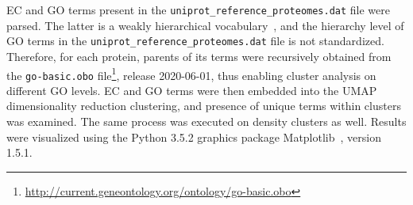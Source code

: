 EC and GO terms present in the \texttt{uniprot\_reference\_proteomes.dat} file were
parsed.
The latter is a weakly hierarchical vocabulary~\cite{ashburner2000gene}, and the hierarchy
level of GO terms in the \texttt{uniprot\_reference\_proteomes.dat} file is not
standardized.
Therefore, for each protein, parents of its terms were recursively obtained from the
\texttt{go-basic.obo}
file\footnote{\url{http://current.geneontology.org/ontology/go-basic.obo}}, release
2020-06-01, thus enabling cluster analysis on different GO levels.
EC and GO terms were then embedded into the UMAP dimensionality reduction clustering, and
presence of unique terms within clusters was examined.
The same process was executed on density clusters as well.
Results were visualized using the Python 3.5.2 graphics package
Matplotlib~\cite{hunter2007matplotlib}, version 1.5.1.

